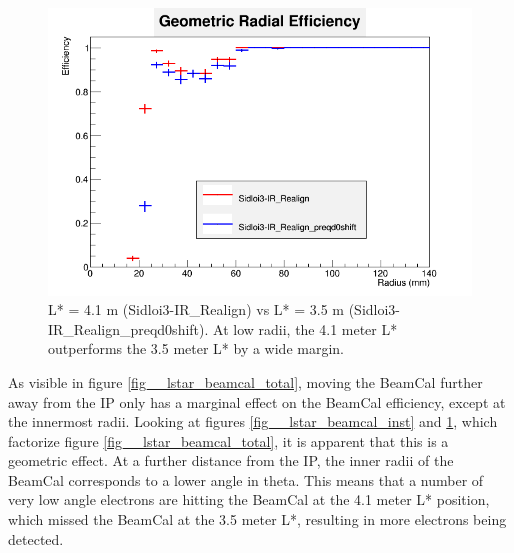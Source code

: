 \documentclass{report}
\begin{document}
                \begin{figure}[H]
                    \includegraphics[height=.4\textheight]{RadialEfficiencyFP_geometric}
                    \centering
                    \caption{L* = 4.1 m (Sidloi3-IR\_Realign) vs L* = 3.5 m (Sidloi3-IR\_Realign\_preqd0shift). At low radii, the 4.1 meter L* outperforms the 3.5 meter L* by a wide margin. }
                    \label{fig__lstar_beamcal_geom}
                \end{figure}

                As visible in figure \ref{fig__lstar_beamcal_total}, moving the BeamCal further away from the IP only has a marginal effect on the BeamCal efficiency, except at the innermost radii. Looking at figures \ref{fig__lstar_beamcal_inst} and \ref{fig__lstar_beamcal_geom}, which factorize figure \ref{fig__lstar_beamcal_total}, it is apparent that this is a geometric effect. At a further distance from the IP, the inner radii of the BeamCal corresponds to a lower angle in theta. This means that a number of very low angle electrons are hitting the BeamCal at the 4.1 meter L* position, which missed the BeamCal at the 3.5 meter L*, resulting in more electrons being detected.
                    
\end{document}
